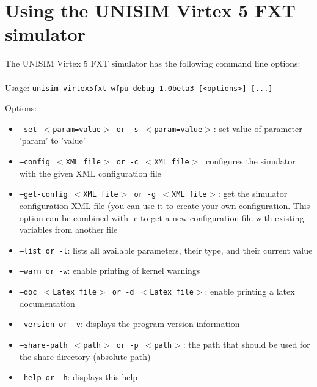 \section{Using the UNISIM Virtex 5 FXT simulator}
\label{UNISIM Virtex 5 FXT_using}
The UNISIM Virtex 5 FXT simulator has the following command line options:\\
~\\
\noindent Usage: \texttt{unisim-virtex5fxt-wfpu-debug-1.0beta3 [<options>] [...]}

\noindent Options:
\begin{itemize}
\item \texttt{--set $<$param=value$>$ or -s $<$param=value$>$}: set value of parameter 'param' to 'value'
\item \texttt{--config $<$XML file$>$ or -c $<$XML file$>$}: configures the simulator with the given XML configuration file
\item \texttt{--get-config $<$XML file$>$ or -g $<$XML file$>$}: get the simulator configuration XML file (you can use it to create your own configuration. This option can be combined with -c to get a new configuration file with existing variables from another file
\item \texttt{--list or -l}: lists all available parameters, their type, and their current value
\item \texttt{--warn or -w}: enable printing of kernel warnings
\item \texttt{--doc $<$Latex file$>$ or -d $<$Latex file$>$}: enable printing a latex documentation
\item \texttt{--version or -v}: displays the program version information
\item \texttt{--share-path $<$path$>$ or -p $<$path$>$}: the path that should be used for the share directory (absolute path)
\item \texttt{--help or -h}: displays this help
\end{itemize}
